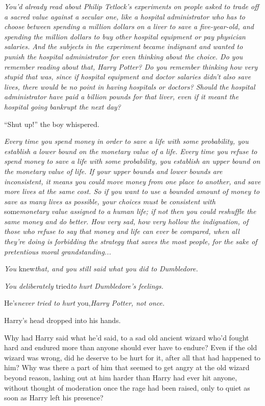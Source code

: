 \emph{You'd already read about Philip Tetlock's experiments on people
asked to trade off a sacred value against a secular one, like a hospital
administrator who has to choose between spending a million dollars on a
liver to save a five-year-old, and spending the million dollars to buy
other hospital equipment or pay physician salaries. And the subjects in
the experiment became indignant and wanted to punish the hospital
administrator for even thinking about the choice. Do you remember
reading about that, Harry Potter? Do you remember thinking how very
stupid that was, since if hospital equipment and doctor salaries didn't
also save lives, there would be no point in having hospitals or doctors?
Should the hospital administrator have paid a billion pounds for that
liver, even if it meant the hospital going bankrupt the next day?}

``Shut up!'' the boy whispered.

\emph{Every time you spend money in order to save a life with some
probability, you establish a lower bound on the monetary value of a
life. Every time you refuse to spend money to save a life with some
probability, you establish an upper bound on the monetary value of life.
If your upper bounds and lower bounds are inconsistent, it means you
could move money from one place to another, and save more lives at the
same cost. So if you want to use a bounded amount of money to save as
many lives as possible, your choices must be consistent with}
some\emph{monetary value assigned to a human life; if not then you could
reshuffle the same money and do better. How very sad, how very hollow
the indignation, of those who refuse to say that money and life can ever
be compared, when all they're doing is forbidding the strategy that
saves the most people, for the sake of pretentious moral
grandstanding...}

\emph{You} knew\emph{that, and you still said what you did to
Dumbledore.}

\emph{You deliberately} tried\emph{to hurt Dumbledore's feelings.}

He's\emph{never tried to hurt} you,\emph{Harry Potter, not once.}

Harry's head dropped into his hands.

Why had Harry said what he'd said, to a sad old ancient wizard who'd
fought hard and endured more than anyone should ever have to endure?
Even if the old wizard was wrong, did he deserve to be hurt for it,
after all that had happened to him? Why was there a part of him that
seemed to get angry at the old wizard beyond reason, lashing out at him
harder than Harry had ever hit anyone, without thought of moderation
once the rage had been raised, only to quiet as soon as Harry left his
presence?


